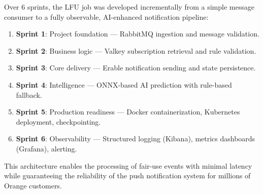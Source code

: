 Over 6 sprints, the LFU job was developed incrementally from a simple message consumer to a fully observable, AI-enhanced notification pipeline:

\begin{enumerate}
    \item \textbf{Sprint 1}: Project foundation --- RabbitMQ ingestion and message validation.
    \item \textbf{Sprint 2}: Business logic --- Valkey subscription retrieval and rule validation.
    \item \textbf{Sprint 3}: Core delivery --- Erable notification sending and state persistence.
    \item \textbf{Sprint 4}: Intelligence --- ONNX-based AI prediction with rule-based fallback.
    \item \textbf{Sprint 5}: Production readiness --- Docker containerization, Kubernetes deployment, checkpointing.
    \item \textbf{Sprint 6}: Observability --- Structured logging (Kibana), metrics dashboards (Grafana), alerting.
\end{enumerate}

This architecture enables the processing of fair-use events with minimal latency while guaranteeing the reliability of the push notification system for millions of Orange customers.

